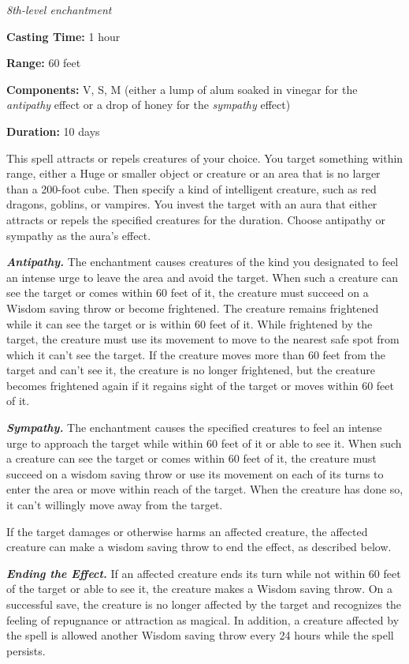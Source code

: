 \documentclass[
]{article}
\begin{document}
\emph{8th-level enchantment}

\textbf{Casting Time:} 1 hour

\textbf{Range:} 60 feet

\textbf{Components:} V, S, M (either a lump of alum soaked in vinegar
for the \emph{antipathy} effect or a drop of honey for the
\emph{sympathy} effect)

\textbf{Duration:} 10 days

This spell attracts or repels creatures of your choice. You target
something within range, either a Huge or smaller object or creature or
an area that is no larger than a 200-foot cube. Then specify a kind of
intelligent creature, such as red dragons, goblins, or vampires. You
invest the target with an aura that either attracts or repels the
specified creatures for the duration. Choose antipathy or sympathy as
the aura's effect.

\emph{\textbf{Antipathy.}} The enchantment causes creatures of the kind
you designated to feel an intense urge to leave the area and avoid the
target. When such a creature can see the target or comes within 60 feet
of it, the creature must succeed on a Wisdom saving throw or become
frightened. The creature remains frightened while it can see the target
or is within 60 feet of it. While frightened by the target, the creature
must use its movement to move to the nearest safe spot from which it
can't see the target. If the creature moves more than 60 feet from the
target and can't see it, the creature is no longer frightened, but the
creature becomes frightened again if it regains sight of the target or
moves within 60 feet of it.

\emph{\textbf{Sympathy.}} The enchantment causes the specified creatures
to feel an intense urge to approach the target while within 60 feet of
it or able to see it. When such a creature can see the target or comes
within 60 feet of it, the creature must succeed on a wisdom saving throw
or use its movement on each of its turns to enter the area or move
within reach of the target. When the creature has done so, it can't
willingly move away from the target.

If the target damages or otherwise harms an affected creature, the
affected creature can make a wisdom saving throw to end the effect, as
described below.

\emph{\textbf{Ending the Effect.}} If an affected creature ends its turn
while not within 60 feet of the target or able to see it, the creature
makes a Wisdom saving throw. On a successful save, the creature is no
longer affected by the target and recognizes the feeling of repugnance
or attraction as magical. In addition, a creature affected by the spell
is allowed another Wisdom saving throw every 24 hours while the spell
persists.
\end{document}
